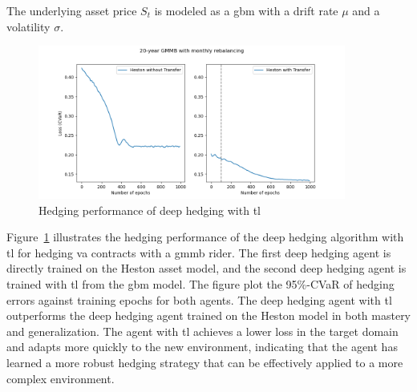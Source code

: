 The underlying asset price $S_t$ is modeled as a \gls{gbm} with a drift rate $\mu$ and a volatility $\sigma$.

\begin{figure}
    \centering
    \includegraphics[width=0.9\textwidth]{./futureWork/figures/CVaR_histories.png}
    \caption{Hedging performance of deep hedging with \gls{tl}}
    \label{fig3:dh-transfers}
\end{figure}

Figure~\ref{fig3:dh-transfers} illustrates the hedging performance of the deep hedging algorithm with \gls{tl} for hedging \gls{va} contracts with a \gls{gmmb} rider.
The first deep hedging agent is directly trained on the Heston asset model, and the second deep hedging agent is trained with \gls{tl} from the \gls{gbm} model.
The figure plot the 95\%-CVaR of hedging errors against training epochs for both agents.
The deep hedging agent with \gls{tl} outperforms the deep hedging agent trained on the Heston model in both mastery and generalization.
The agent with \gls{tl} achieves a lower loss in the target domain and adapts more quickly to the new environment, indicating that the agent has learned a more robust hedging strategy that can be effectively applied to a more complex environment.

